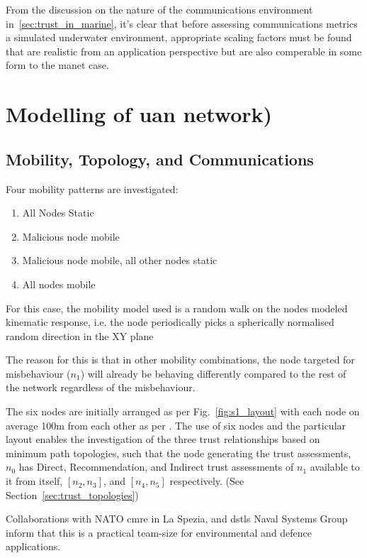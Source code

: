 From the discussion on the nature of the communications environment in~\autoref{sec:trust_in_marine}, it's clear that before assessing communications metrics a simulated underwater environment, appropriate scaling factors must be found that are realistic from an application perspective but are also comperable in some form to the \gls{manet} case.

\section{Modelling of \gls{uan} network)\label{sec:initialsystemcharacterization}}


\subsection{Mobility, Topology, and Communications}

Four mobility patterns are investigated:
\begin{enumerate}
	\item All Nodes Static
	\item Malicious node mobile
	\item Malicious node mobile, all other nodes static
	\item All nodes mobile
\end{enumerate}

For this case, the mobility model used is a random walk on the nodes modeled kinematic response, i.e. the node periodically picks a spherically normalised random direction in the XY plane

The reason for this is that in other mobility combinations, the node targeted for misbehaviour ($n_1$) will already be behaving differently compared to the rest of the network regardless of the misbehaviour.

The six nodes are initially arranged as per Fig.~\ref{fig:s1_layout} with each node on average 100m from each other as per \cite{Guo11}.
The use of six nodes and the particular layout enables the investigation of the three trust relationships based on minimum path topologies, such that the node generating the trust assessments, $n_0$ has Direct, Recommendation, and Indirect trust assessments of $n_1$ available to it from itself, $[n_2,n_3]$, and $[n_4,n_5]$ respectively. 
(See Section~\ref{sec:trust_topologies})

Collaborations with NATO \gls{cmre} in La Spezia, and \glspl{dstl} Naval Systems Group inform that this is a practical team-size for environmental and defence applications.

